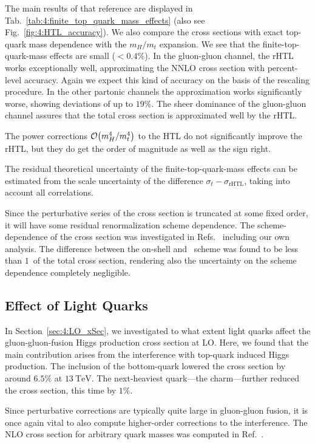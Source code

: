 The main results of that reference are displayed in Tab.~\ref{tab:4:finite_top_quark_mass_effects} (also see Fig.~\ref{fig:4:HTL_accuracy}). We also compare the cross sections with exact top-quark mass dependence with the $m_H/m_t$ expansion. We see that the finite-top-quark-mass effects are small ($<0.4\%$). In the gluon-gluon channel, the \acs{rHTL} works exceptionally well, approximating the \acs{NNLO} cross section with percent-level accuracy. Again we expect this kind of accuracy on the basis of the rescaling procedure. In the other partonic channels the approximation works significantly worse, showing deviations of up to $19\%$. The sheer dominance of the gluon-gluon channel assures that the total cross section is approximated well by the \acs{rHTL}.

The power corrections $\mathcal{O}\!\left(m_H^4/m_t^4\right)$ to the \acs{HTL} do not significantly improve the \acs{rHTL}, but they do get the order of magnitude as well as the sign right.

The residual theoretical uncertainty of the finite-top-quark-mass effects can be estimated from the scale uncertainty of the difference $\sigma_{t} - \sigma_{\mathrm{rHTL}}$, taking into account all correlations.

Since the perturbative series of the cross section is truncated at some fixed order, it will have some residual renormalization scheme dependence. The scheme-dependence of the cross section was investigated in Refs.~\cite{Anastasiou:2016cez, Czakon:2024ywb} including our own analysis. The difference between the on-shell and \MS\ scheme was found to be less than $1$\textperthousand\ of the total cross section, rendering also the uncertainty on the scheme dependence completely negligible.

\subsection{Effect of Light Quarks} \label{subsec:4:effect_of_light_quarks}
In Section~\ref{sec:4:LO_xSec}, we investigated to what extent light quarks affect the gluon-gluon-fusion Higgs production cross section at \acs{LO}. Here, we found that the main contribution arises from the interference with top-quark induced Higgs production. The inclusion of the bottom-quark lowered the cross section by around $6.5\%$ at $13\ \mathrm{TeV}$. The next-heaviest quark---the charm---further reduced the cross section, this time by $1\%$.

Since perturbative corrections are typically quite large in gluon-gluon fusion, it is once again vital to also compute higher-order corrections to the interference. The \acs{NLO} cross section for arbitrary quark masses was computed in Ref.~\cite{Graudenz:1992pv}.

